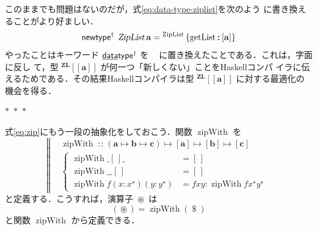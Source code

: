 \documentclass[a5paper,twoside,fleqn,draft]{jsbook}
\def\[{[\![}
\def\]{]\!]}
\newcommand{\separator}{\begin{center}$*$~$*$~$*$\end{center}}
\newcommand{\programminglanguage}[1]{\textsf{#1}}
\newcommand{\haskell}{\programminglanguage{Haskell}}
\newcommand{\mBrace}{\Vert}
\newcommand{\mKeyword}[1]{\mathsf{#1}}
\newcommand{\mKeywordUnderline}[1]{\text{\underline{\textsf{#1}}}}
\newcommand{\mDataTypeKeyword}{\mKeywordUnderline{data}\mKeyword{type}}
\newcommand{\mNewTypeDeclKeyword}{\mKeyword{newtype}}
\DeclareMathOperator{\mDataTypePolymorphic}{\mDataTypeKeyword^\dagger}
\DeclareMathOperator{\mNewTypeDeclPolymorphic}{\mNewTypeDeclKeyword^\dagger}
\newcommand{\mEmptyList}{{[\,]}}
\newcommand{\mSpecialFunc}[1]{#1}
\DeclareMathOperator{\mGetList}{\mSpecialFunc{getList}}
\DeclareMathOperator{\mZipWith}{\mSpecialFunc{zipWith}}
\DeclareMathOperator{\mApply}{\$}
\DeclareMathOperator{\mFuncArrow}{\mapsto}
\DeclareMathOperator{\mIn}{{:\!:}}
\DeclareMathOperator{\mZip}{\circledast}
\newcommand{\mType}[1]{\mathbf{#1}} %
\newcommand{\mA}{\mType{a}}
\newcommand{\mB}{\mType{b}}
\newcommand{\mC}{\mType{c}}
\newcommand{\mTypeAssemble}[2]{{}^\mType{#1}\[\mType{#2}\]}
\newcommand{\mZipListType}[1]{\mTypeAssemble{ZL}{#1}}
\newcommand{\mTypeConstructor}[1]{\textsl{#1}}
\DeclareMathOperator{\mZipListTypeConstructor}{\mTypeConstructor{ZipList}}
\newcommand{\mValueConstructor}[1]{\mathrm{#1}}
\newcommand{\mValueRecordBeginWith}[1]{{}^\mValueConstructor{#1}\,\{}
\newcommand{\mValueRecordEnd}{\}}
\newcommand{\mValueRecordWith}[2]{\mValueRecordBeginWith{#1}{#2}\mValueRecordEnd}
\newcommand{\mZipListRecordWith}[1]{\mValueRecordWith{ZipList}{#1}}
\newcommand{\mList}[1]{{#1}^\mathrm{\star}}
\newcommand{\mProjEXP}[2]{#1\mFuncArrow#2} %
\begin{document}
このままでも問題はないのだが，式\eqref{eq:data-type-ziplist}を次のよう
に書き換えることがより好ましい．
\begin{equation}
  \mNewTypeDeclPolymorphic\;
  \mZipListTypeConstructor\mA
  =\mZipListRecordWith{\mGetList\mIn{}[\mA]}
\end{equation}
やったことはキーワード $\mDataTypePolymorphic$ を
$\mNewTypeDeclPolymorphic$ に置き換えたことである．これは，字面に反し
て，型 $\mZipListType{a}$ が何一つ「新しくない」ことを\haskell コンパ
イラに伝えるためである．その結果\haskell コンパイラは型
$\mZipListType{a}$ に対する最適化の機会を得る．

\separator

式\eqref{eq:zip}にもう一段の抽象化をしておこう．関数 $\mZipWith$ を
\begin{equation}
  \left\mBrace
  \begin{aligned}
    {}&\mZipWith\mIn{}\mProjEXP{\mProjEXP{\mProjEXP{(\mProjEXP{\mA }
          {\mProjEXP{\mB }{\mC }})}
        {[\mA]}}{[\mB]}}{[\mC]}\\
    {}&\left\{\begin{aligned}
    \mZipWith\_\mEmptyList\_
    &=\mEmptyList\\
    \mZipWith\_\_\mEmptyList
    &=\mEmptyList\\
    \mZipWith f(x:\mList{x})(y:\mList{y})
    &=fxy:\mZipWith f\mList{x}\mList{y}
    \end{aligned}
    \right.
  \end{aligned}
  \right.
\end{equation}
と定義する．こうすれば，演算子 $\mZip$ は
\begin{equation}
  (\mZip)
  =\mZipWith(\mApply)
\end{equation}
と関数 $\mZipWith$ から定義できる．
\end{document}
